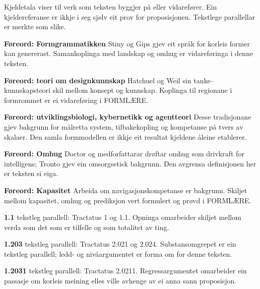 \begin{widebody}\small
Kjeldetala viser til verk som teksten byggjer på eller vidarefører. Ein kjeldereferanse er ikkje i seg sjølv eit prov for proposisjonen. Tekstlege parallellar er merkte som slike.

\noindent\hypertarget{kjeldenotat-intro-1}{}\textbf{Føreord: Formgrammatikken} Stiny og Gips gjev eit språk for korleis former kan genererast. Samankoplinga med landskap og omhug er vidareføringa i denne teksten.\par\medskip
\noindent\hypertarget{kjeldenotat-intro-2}{}\textbf{Føreord: teori om designkunnskap} Hatchuel og Weil sin tanke–kunnskapsteori skil mellom konsept og kunnskap. Koplinga til regionane i formrommet er ei vidareføring i FORMLÆRE.\par\medskip
\noindent\hypertarget{kjeldenotat-intro-3}{}\textbf{Føreord: utviklingsbiologi, kybernetikk og agentteori} Desse tradisjonane gjev bakgrunn for målretta system, tilbakekopling og kompetanse på tvers av skalaer. Den samla formmodellen er ikkje eit resultat kjeldene åleine etablerer.\par\medskip
\noindent\hypertarget{kjeldenotat-intro-4}{}\textbf{Føreord: Omhug} Doctor og medforfattarar drøftar omhug som drivkraft for intelligens; Tronto gjev ein omsorgsetisk bakgrunn. Den avgrensa definisjonen her er teksten si eiga.\par\medskip
\noindent\hypertarget{kjeldenotat-intro-5}{}\textbf{Føreord: Kapasitet} Arbeida om navigasjonskompetanse er bakgrunn. Skiljet mellom kapasitet, omhug og prediksjon vert formulert og prøvd i FORMLÆRE.\par\medskip
\noindent\hypertarget{kjeldenotat-1.1}{}\textbf{1.1} tekstleg parallell: Tractatus 1 og 1.1. Opninga omarbeider skiljet mellom verda som det som er tilfelle og som totalitet av ting.\par\medskip
\noindent\hypertarget{kjeldenotat-1.203}{}\textbf{1.203} tekstleg parallell: Tractatus 2.021 og 2.024. Substansomgrepet er ein tekstleg parallell; ledd- og nivåargumentet er forma om for denne teksten.\par\medskip
\noindent\hypertarget{kjeldenotat-1.2031}{}\textbf{1.2031} tekstleg parallell: Tractatus 2.0211. Regressargumentet omarbeider ein passasje om korleis meining elles ville avhenge av ei anna sann proposisjon.\par\medskip

\end{widebody}
